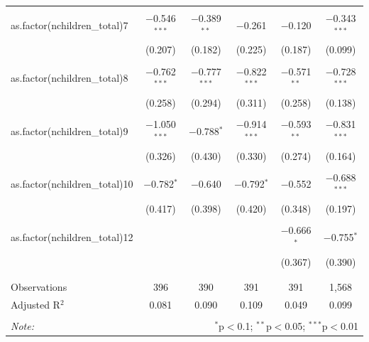 \begin{table}[!htbp]
\begin{tabular}{@{\extracolsep{5pt}}lccccc}
  & & & & & \\ 
 as.factor(nchildren\_total)7 & $-$0.546$^{***}$ & $-$0.389$^{**}$ & $-$0.261 & $-$0.120 & $-$0.343$^{***}$ \\ 
  & (0.207) & (0.182) & (0.225) & (0.187) & (0.099) \\ 
  & & & & & \\ 
 as.factor(nchildren\_total)8 & $-$0.762$^{***}$ & $-$0.777$^{***}$ & $-$0.822$^{***}$ & $-$0.571$^{**}$ & $-$0.728$^{***}$ \\ 
  & (0.258) & (0.294) & (0.311) & (0.258) & (0.138) \\ 
  & & & & & \\ 
 as.factor(nchildren\_total)9 & $-$1.050$^{***}$ & $-$0.788$^{*}$ & $-$0.914$^{***}$ & $-$0.593$^{**}$ & $-$0.831$^{***}$ \\ 
  & (0.326) & (0.430) & (0.330) & (0.274) & (0.164) \\ 
  & & & & & \\ 
 as.factor(nchildren\_total)10 & $-$0.782$^{*}$ & $-$0.640 & $-$0.792$^{*}$ & $-$0.552 & $-$0.688$^{***}$ \\ 
  & (0.417) & (0.398) & (0.420) & (0.348) & (0.197) \\ 
  & & & & & \\ 
 as.factor(nchildren\_total)12 &  &  &  & $-$0.666$^{*}$ & $-$0.755$^{*}$ \\ 
  &  &  &  & (0.367) & (0.390) \\ 
  & & & & & \\ 
\hline \\[-1.8ex] 
Observations & 396 & 390 & 391 & 391 & 1,568 \\ 
Adjusted R$^{2}$ & 0.081 & 0.090 & 0.109 & 0.049 & 0.099 \\ 
\hline 
\hline \\[-1.8ex] 
\textit{Note:}  & \multicolumn{5}{r}{$^{*}$p$<$0.1; $^{**}$p$<$0.05; $^{***}$p$<$0.01} \\ 
\end{tabular} 
\end{table} 
